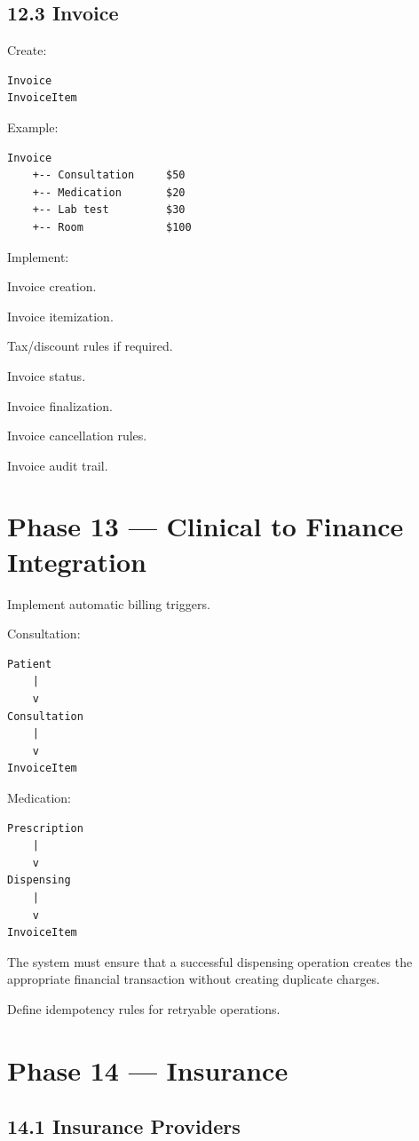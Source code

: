 \documentclass[11pt,a4paper]{article}
\newcommand{\task}[1]{\item[$\square$] #1}
\begin{document}
\subsection{12.3 Invoice}

Create:

\begin{lstlisting}
Invoice
InvoiceItem
\end{lstlisting}

Example:

\begin{lstlisting}
Invoice
    +-- Consultation     $50
    +-- Medication       $20
    +-- Lab test         $30
    +-- Room             $100
\end{lstlisting}

Implement:

\task{Invoice creation.}
\task{Invoice itemization.}
\task{Tax/discount rules if required.}
\task{Invoice status.}
\task{Invoice finalization.}
\task{Invoice cancellation rules.}
\task{Invoice audit trail.}

\section{Phase 13 --- Clinical to Finance Integration}

Implement automatic billing triggers.

Consultation:

\begin{lstlisting}
Patient
    |
    v
Consultation
    |
    v
InvoiceItem
\end{lstlisting}

Medication:

\begin{lstlisting}
Prescription
    |
    v
Dispensing
    |
    v
InvoiceItem
\end{lstlisting}

The system must ensure that a successful dispensing operation creates the
appropriate financial transaction without creating duplicate charges.

Define idempotency rules for retryable operations.

\section{Phase 14 --- Insurance}

\subsection{14.1 Insurance Providers}
\end{document}
